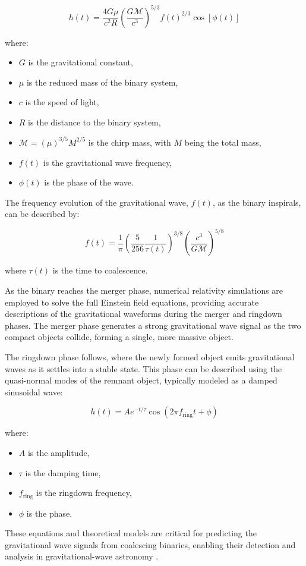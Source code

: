 \begin{equation}
h(t) = \frac{4G\mu}{c^2R} \left( \frac{G\mathcal{M}}{c^3} \right)^{5/3} f(t)^{2/3} \cos[\phi(t)]
\end{equation}

where:
\begin{itemize}
    \item \( G \) is the gravitational constant,
    \item \( \mu \) is the reduced mass of the binary system,
    \item \( c \) is the speed of light,
    \item \( R \) is the distance to the binary system,
    \item \( \mathcal{M} = (\mu)^{3/5}M^{2/5} \) is the chirp mass, with \( M \) being the total mass,
    \item \( f(t) \) is the gravitational wave frequency,
    \item \( \phi(t) \) is the phase of the wave.
\end{itemize}

The frequency evolution of the gravitational wave, \( f(t) \), as the binary inspirals, can be described by:

\begin{equation}
f(t) = \frac{1}{\pi} \left( \frac{5}{256} \frac{1}{\tau(t)} \right)^{3/8} \left( \frac{c^3}{G\mathcal{M}} \right)^{5/8}
\end{equation}

where \( \tau(t) \) is the time to coalescence.

As the binary reaches the merger phase, numerical relativity simulations are employed to solve the full Einstein field equations, providing accurate descriptions of the gravitational waveforms during the merger and ringdown phases. The merger phase generates a strong gravitational wave signal as the two compact objects collide, forming a single, more massive object.

The ringdown phase follows, where the newly formed object emits gravitational waves as it settles into a stable state. This phase can be described using the quasi-normal modes of the remnant object, typically modeled as a damped sinusoidal wave:

\begin{equation}
h(t) = A e^{-t/\tau} \cos(2\pi f_{\text{ring}} t + \phi)
\end{equation}

where:
\begin{itemize}
    \item \( A \) is the amplitude,
    \item \( \tau \) is the damping time,
    \item \( f_{\text{ring}} \) is the ringdown frequency,
    \item \( \phi \) is the phase.
\end{itemize}

These equations and theoretical models are critical for predicting the gravitational wave signals from coalescing binaries, enabling their detection and analysis in gravitational-wave astronomy \citep{Blanchet_2002}.
